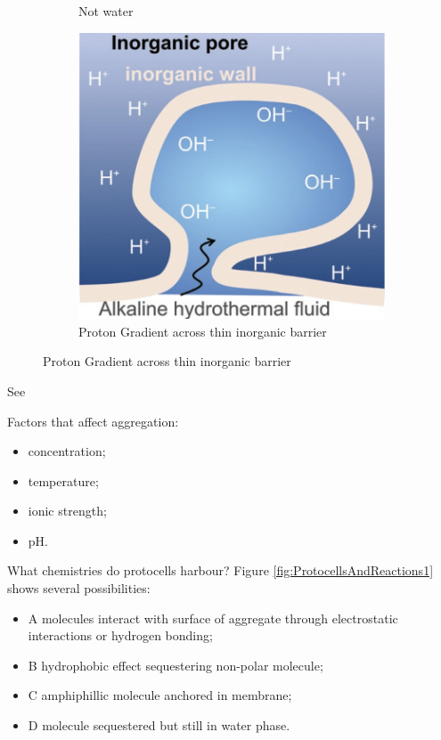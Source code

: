 \documentclass[]{article}
\begin{document}
\begin{figure}[H]
\begin{subfigure}[b]{0.3\textwidth}
		\caption{Not water}
		\label{fig:not-water}
	\end{subfigure}
	\hfill
	\begin{subfigure}[b]{0.3\textwidth}
		\centering
		\includegraphics[width=\textwidth]{SelfAssembled3}
		\caption{Proton Gradient across thin inorganic barrier}
		\label{fig:proton-gradient}
	\end{subfigure}

\end{figure}

See \cite{sojo2016origin}

Factors that affect aggregation:
\begin{itemize}
	\item concentration;
	\item temperature;
	\item ionic strength;
	\item pH.
\end{itemize}

What chemistries do protocells harbour? Figure \ref{fig:ProtocellsAndReactions1} shows several possibilities:
\begin{itemize}
	\item A molecules interact with surface of aggregate through electrostatic interactions or hydrogen bonding;
	\item B hydrophobic effect sequestering non-polar molecule;
	\item C amphiphillic molecule anchored in membrane; 
	\item D molecule sequestered but still in water phase.
\end{itemize}
\end{document}
